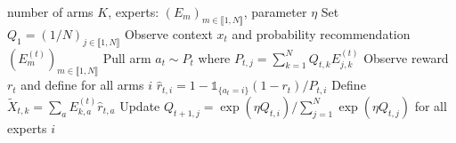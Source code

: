 \begin{algorithm}[H]
  \caption{\expfour}
  \label{alg:exp4}
\begin{algorithmic}
	 number of arms $K$, experts: $(E_{m})_{m\in\llbracket 1, N\rrbracket}$, parameter $\eta$
  \STATE Set $Q_{1} = (1/N)_{j\in\llbracket 1, N\rrbracket}$
  \STATE Observe context $x_{t}$ and probability recommendation $(E_{m}^{(t)})_{m\in\llbracket 1, N\rrbracket}$
  \STATE Pull arm $a_{t}\sim P_{t}$ where $P_{t,j} = \sum_{k=1}^{N} Q_{t,k}E_{j,k}^{(t)}$ 
  \STATE Observe reward $r_{t}$ and define for all arms $i$ $\hat{r}_{t,i} = 1 - \mathds{1}_{\{ a_{t}=i\}}( 1 - r_{t})/P_{t,i}$
  \STATE Define $\tilde{X}_{t,k} = \sum_{a} E_{k, a}^{(t)}\hat{r}_{t,a}$
  \STATE Update $Q_{t+1, j} = \exp(\eta Q_{t,i})/\sum_{j=1}^{N} \exp(\eta Q_{t,j})$ for all experts $i$
  \ENDFOR
\end{algorithmic}
\end{algorithm}
